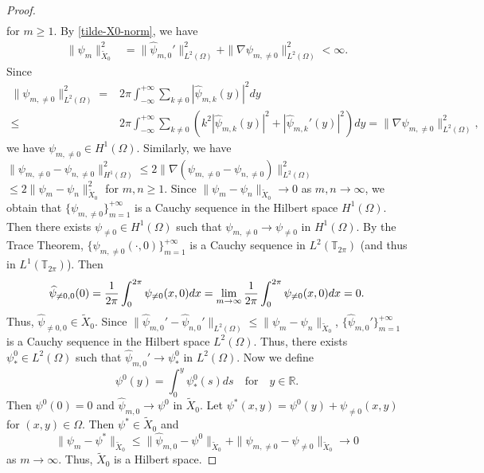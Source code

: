 \documentclass[1 [leqno, 11pt]{amsart}
\numberwithin{equation}{section}
\begin{document}
\begin{CJK*}{GBK}{song}
\begin{proof}
\begin{align}
\end{align}
for $m\geq1$.
By \eqref{tilde-X0-norm}, we have
\begin{align*}
\|\psi_m\|^2_{\tilde{X}_0}
& = \| \widehat{\psi}_{m,0}'\|^2_{L^2(\Omega)} + \|\nabla\psi_{m,\neq 0}\|^2_{L^2(\Omega)} < \infty.
\end{align*}
Since
\begin{align*}
\|\psi_{m,\neq 0}\|^2_{L^2(\Omega)} =&2\pi \int_{-\infty}^{+\infty} \sum_{k\neq0}  \left|\widehat{\psi}_{m,k}(y)\right|^2 dy \\
\leq&
2\pi \int_{-\infty}^{+\infty} \sum_{k\neq0}\left(  k^2 \left|\widehat{\psi}_{m,k}(y)\right|^2 +\left| \widehat{\psi}_{m,k}'(y)\right|^2\right) dy = \|\nabla\psi_{m,\neq 0}\|^2_{L^2(\Omega)}, \end{align*}
we have $\psi_{m,\neq 0}\in H^1(\Omega)$. Similarly, we have $\|\psi_{m,\neq 0} -  \psi_{n,\neq 0}\|_{H^1(\Omega)}^2\leq 2\|\nabla(\psi_{m,\neq 0} -  \psi_{n,\neq 0})\|_{L^2(\Omega)}^2$ $\leq2\|\psi_m -  \psi_n\|_{\tilde{X}_0}^2$ for $m,n\geq1$. Since $\|\psi_m - \psi_n\|_{\tilde{X}_0} \to 0$ as $m,n \rightarrow \infty$, we obtain that $\{\psi_{m,\neq 0} \}_{m=1}^{+\infty}$ is a Cauchy sequence in the Hilbert space $H^1(\Omega)$. Then
there exists $ \psi_{\neq0} \in H^1(\Omega)$   such that
$ \psi_{m,\neq 0} \to\psi_{\neq0}$ in $H^1(\Omega)$. By the Trace Theorem, $\{\psi_{m,\neq 0}(\cdot,0) \}_{m=1}^{+\infty}$ is a Cauchy sequence in $L^{2}(\mathbb{T}_{2\pi})$ (and thus in $L^{1}(\mathbb{T}_{2\pi})$). Then
$$\widehat{\psi}_{\neq0,0}(0)={1\over2\pi}\int_{0}^{2\pi}\psi_{\neq0}(x,0)dx=\lim_{m\to\infty}{1\over2\pi}\int_{0}^{2\pi}\psi_{\neq0}(x,0)dx=0.$$
Thus, $\widehat{\psi}_{\neq0,0}\in\tilde{X}_0$.
Since $ \|\widehat{\psi}_{m,0}'-\widehat{\psi}_{n,0}'\|_{L^2(\Omega)}\leq \|{\psi}_{m}-{\psi}_{n}\|_{\tilde{X}_0}$,
 $\{\widehat{\psi}_{m,0}' \}_{m=1}^{+\infty}$ is a Cauchy sequence in the Hilbert space $L^2(\Omega)$.
Thus, there exists $ \psi^0_* \in L^2(\Omega)$ such that
$\widehat{\psi}_{m,0}'\to  \psi^0_*$ in $L^2(\Omega)$.
Now we define $$\psi^0(y) = \int_{0}^{y} \psi^0_*(s) ds\quad\text{for}\quad y\in\mathbb{R}.$$
Then $\psi^0(0) = 0$ and
$ \widehat{\psi}_{m,0} \to \psi^{0}$ in $\tilde{X}_0$.
Let $\psi^*(x,y) = \psi^0(y) + \psi_{\neq0}(x,y)$ for $(x,y)\in\Omega$. Then $\psi^*\in \tilde{X}_0$ and
$$\|\psi_m - \psi^*\|_{\tilde{X}_0}\leq  \|\widehat\psi_{m,0} - \psi^0\|_{\tilde{X}_0} +  \| \psi_{m,\neq 0} -  \psi_{\neq0}\|_{\tilde{X}_0} \to0$$
as $m\to\infty$. Thus, $\tilde{X}_0$ is a Hilbert space.
\end{proof}

\end{CJK*}
\end{document}
